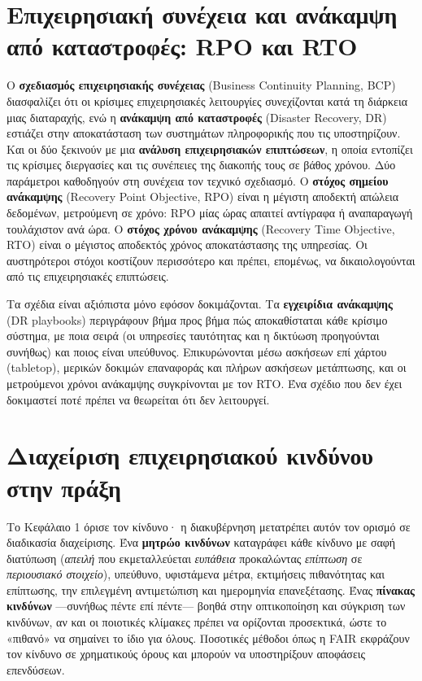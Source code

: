 \documentclass[11pt,openany]{book}
\begin{document}
\section{Επιχειρησιακή συνέχεια και ανάκαμψη από καταστροφές: RPO και RTO}\label{sec:13.2}
Ο \textbf{σχεδιασμός επιχειρησιακής συνέχειας} (Business Continuity Planning, BCP) διασφαλίζει ότι οι κρίσιμες επιχειρησιακές λειτουργίες συνεχίζονται κατά τη διάρκεια μιας διαταραχής, ενώ η \textbf{ανάκαμψη από καταστροφές} (Disaster Recovery, DR) εστιάζει στην αποκατάσταση των συστημάτων πληροφορικής που τις υποστηρίζουν. Και οι δύο ξεκινούν με μια \textbf{ανάλυση επιχειρησιακών επιπτώσεων}, η οποία εντοπίζει τις κρίσιμες διεργασίες και τις συνέπειες της διακοπής τους σε βάθος χρόνου. Δύο παράμετροι καθοδηγούν στη συνέχεια τον τεχνικό σχεδιασμό. Ο \textbf{στόχος σημείου ανάκαμψης} (Recovery Point Objective, RPO) είναι η μέγιστη αποδεκτή απώλεια δεδομένων, μετρούμενη σε χρόνο: RPO μίας ώρας απαιτεί αντίγραφα ή αναπαραγωγή τουλάχιστον ανά ώρα. Ο \textbf{στόχος χρόνου ανάκαμψης} (Recovery Time Objective, RTO) είναι ο μέγιστος αποδεκτός χρόνος αποκατάστασης της υπηρεσίας. Οι αυστηρότεροι στόχοι κοστίζουν περισσότερο και πρέπει, επομένως, να δικαιολογούνται από τις επιχειρησιακές επιπτώσεις.

Τα σχέδια είναι αξιόπιστα μόνο εφόσον δοκιμάζονται. Τα \textbf{εγχειρίδια ανάκαμψης} (DR playbooks) περιγράφουν βήμα προς βήμα πώς αποκαθίσταται κάθε κρίσιμο σύστημα, με ποια σειρά (οι υπηρεσίες ταυτότητας και η δικτύωση προηγούνται συνήθως) και ποιος είναι υπεύθυνος. Επικυρώνονται μέσω ασκήσεων επί χάρτου (tabletop), μερικών δοκιμών επαναφοράς και πλήρων ασκήσεων μετάπτωσης, και οι μετρούμενοι χρόνοι ανάκαμψης συγκρίνονται με τον RTO. Ένα σχέδιο που δεν έχει δοκιμαστεί ποτέ πρέπει να θεωρείται ότι δεν λειτουργεί.

\section{Διαχείριση επιχειρησιακού κινδύνου στην πράξη}\label{sec:13.3}
Το Κεφάλαιο 1 όρισε τον κίνδυνο· η διακυβέρνηση μετατρέπει αυτόν τον ορισμό σε διαδικασία διαχείρισης. Ένα \textbf{μητρώο κινδύνων} καταγράφει κάθε κίνδυνο με σαφή διατύπωση (\emph{απειλή} που εκμεταλλεύεται \emph{ευπάθεια} προκαλώντας \emph{επίπτωση} σε \emph{περιουσιακό στοιχείο}), υπεύθυνο, υφιστάμενα μέτρα, εκτιμήσεις πιθανότητας και επίπτωσης, την επιλεγμένη αντιμετώπιση και ημερομηνία επανεξέτασης. Ένας \textbf{πίνακας κινδύνων} —συνήθως πέντε επί πέντε— βοηθά στην οπτικοποίηση και σύγκριση των κινδύνων, αν και οι ποιοτικές κλίμακες πρέπει να ορίζονται προσεκτικά, ώστε το «πιθανό» να σημαίνει το ίδιο για όλους. Ποσοτικές μέθοδοι όπως η FAIR εκφράζουν τον κίνδυνο σε χρηματικούς όρους και μπορούν να υποστηρίξουν αποφάσεις επενδύσεων.
\end{document}

